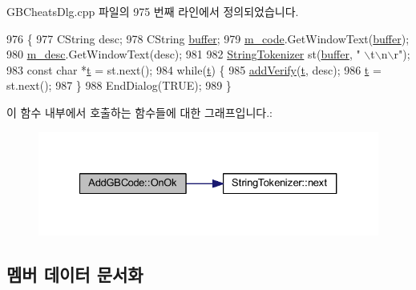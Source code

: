 G\+B\+Cheats\+Dlg.\+cpp 파일의 975 번째 라인에서 정의되었습니다.


\begin{DoxyCode}
976 \{
977   CString desc;
978   CString \mbox{\hyperlink{_g_b_a_8cpp_a28d4d3d8445e73a696b2d6f7eadabd96}{buffer}};
979   \mbox{\hyperlink{class_add_g_b_code_a1336063b1498bee29c2a9df7273d8ca9}{m\_code}}.GetWindowText(\mbox{\hyperlink{_g_b_a_8cpp_a28d4d3d8445e73a696b2d6f7eadabd96}{buffer}});
980   \mbox{\hyperlink{class_add_g_b_code_af67488ee0354c39ce9c818e7f389e74f}{m\_desc}}.GetWindowText(desc);
981   
982   \mbox{\hyperlink{class_string_tokenizer}{StringTokenizer}} st(\mbox{\hyperlink{_g_b_a_8cpp_a28d4d3d8445e73a696b2d6f7eadabd96}{buffer}}, \textcolor{stringliteral}{" \(\backslash\)t\(\backslash\)n\(\backslash\)r"});
983   \textcolor{keyword}{const} \textcolor{keywordtype}{char} *\mbox{\hyperlink{expr_8cpp_aded116371789db1fd63c90ef00c95a3d}{t}} = st.next();
984   \textcolor{keywordflow}{while}(\mbox{\hyperlink{expr_8cpp_aded116371789db1fd63c90ef00c95a3d}{t}}) \{
985     \mbox{\hyperlink{class_add_g_b_code_a3c81ddb0e728491632442e95218f40cf}{addVerify}}(\mbox{\hyperlink{expr_8cpp_aded116371789db1fd63c90ef00c95a3d}{t}}, desc);
986     \mbox{\hyperlink{expr_8cpp_aded116371789db1fd63c90ef00c95a3d}{t}} = st.next();
987   \}
988   EndDialog(TRUE);
989 \}
\end{DoxyCode}
이 함수 내부에서 호출하는 함수들에 대한 그래프입니다.\+:
\nopagebreak
\begin{figure}[H]
\begin{center}
\leavevmode
\includegraphics[width=327pt]{class_add_g_b_code_ad6bdbbb8375531b30329c5ab4689c052_cgraph}
\end{center}
\end{figure}


\subsection{멤버 데이터 문서화}
\mbox{\label{class_add_g_b_code_abed904b4077498637455cbd6f829a742}} 
